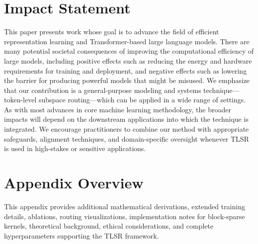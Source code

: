 \documentclass{article}
\theoremstyle{plain}
\theoremstyle{definition}
\theoremstyle{remark}
\begin{document}
\section*{Impact Statement}
This paper presents work whose goal is to advance the field of efficient
representation learning and Transformer-based large language models.
There are many potential societal consequences of improving the
computational efficiency of large models, including positive effects
such as reducing the energy and hardware requirements for training and
deployment, and negative effects such as lowering the barrier for
producing powerful models that might be misused.
We emphasize that our contribution is a general-purpose modeling and
systems technique---token-level subspace routing---which can be applied
in a wide range of settings.
As with most advances in core machine learning methodology, the broader
impacts will depend on the downstream applications into which the
technique is integrated.
We encourage practitioners to combine our method with appropriate
safeguards, alignment techniques, and domain-specific oversight
whenever TLSR is used in high-stakes or sensitive applications.






\newpage
\appendix
\onecolumn


\section{Appendix Overview}
This appendix provides additional mathematical derivations, extended
training details, ablations, routing visualizations, implementation
notes for block-sparse kernels, theoretical background, ethical
considerations, and complete hyperparameters supporting the TLSR
framework.
\end{document}
